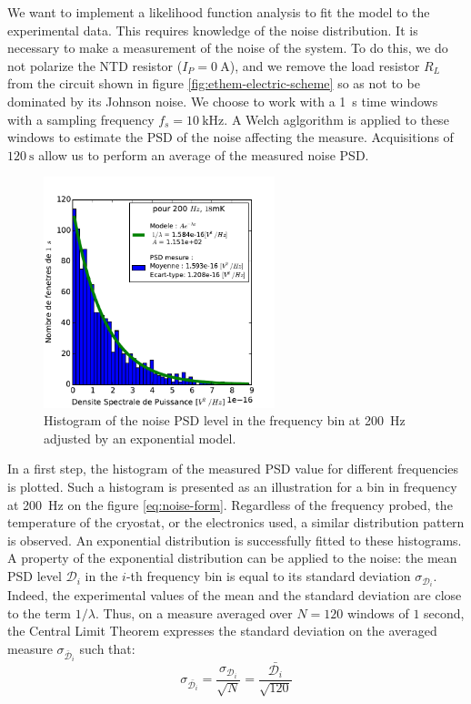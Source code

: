 We want to implement a likelihood function analysis to fit the model to the experimental data. This requires knowledge of the noise distribution. It is necessary to make a measurement of the noise of the system. To do this, we do not polarize the NTD resistor ($I_P=\SI{0}{\ampere}$), and we remove the load resistor $R_L$ from the circuit shown in figure \ref{fig:ethem-electric-scheme} so as not to be dominated by its Johnson noise. We choose to work with a \SI{1}{\s} time windows with a sampling frequency $f_s=\SI{10}{\kilo\Hz}$. A Welch aglgorithm is applied to these windows to estimate the PSD of the noise affecting the measure. Acquisitions of $\SI{120}{\s}$ allow us to perform an average of the measured noise PSD.

\begin{figure}
\begin{center}
\includegraphics[width=0.6\textwidth]{Figures/Ethem/fit_exp_fin.pdf}
\end{center}
\caption{Histogram of the noise PSD level in the frequency bin at \SI{200}{\Hz} adjusted by an exponential model.}
\label{fig:noise-form}
\end{figure}

In a first step, the histogram of the measured PSD value for different frequencies is plotted. Such a histogram is presented as an illustration for a bin in frequency at \SI{200}{\Hz} on the figure \ref{eq:noise-form}. Regardless of the frequency probed, the temperature of the cryostat, or the electronics used, a similar distribution pattern is observed. An exponential distribution is successfully fitted to these histograms. A property of the exponential distribution can be applied to the noise: the mean PSD level $\mathcal{D}_i$ in the $i$-th frequency bin is equal to its standard deviation $\sigma_{\mathcal{D}_i}$. Indeed, the experimental values of the mean and the standard deviation are close to the term $1/\lambda$.
Thus, on a measure averaged over $N=120$ windows of $1$ second, the Central Limit Theorem expresses the standard deviation on the averaged measure $\sigma_{\bar{\mathcal{D}}_i}$ such that:
\begin{equation}
\label{eq:sigma-psd}
\sigma_{\bar{\mathcal{D}_i}} = \frac{\sigma_{\mathcal{D}_i}}{\sqrt{N}} = \frac{\bar{\mathcal{D}_i}}{\sqrt{120}}
\end{equation}

